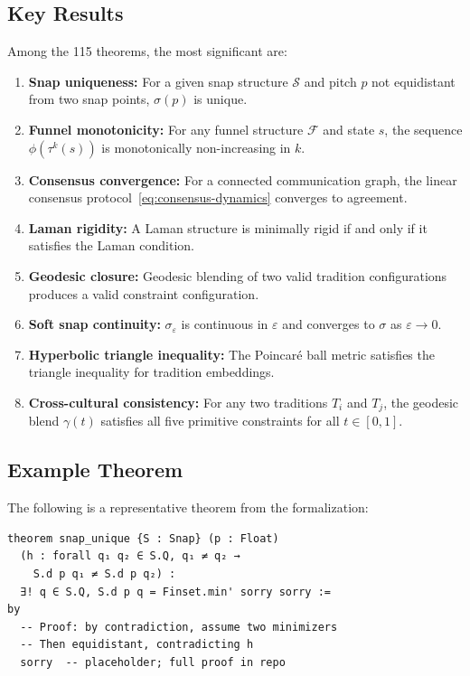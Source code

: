 \documentclass[cmj]{article}
\newcommand{\eps}{\varepsilon}
\begin{document}
\subsection{Key Results}

Among the 115 theorems, the most significant are:

\begin{enumerate}[nosep]
  \item \textbf{Snap uniqueness:} For a given snap structure $\mathcal{S}$ and
    pitch $p$ not equidistant from two snap points, $\sigma(p)$ is unique.
  \item \textbf{Funnel monotonicity:} For any funnel structure $\mathcal{F}$
    and state $s$, the sequence $\phi(\tau^k(s))$ is monotonically
    non-increasing in $k$.
  \item \textbf{Consensus convergence:} For a connected communication graph,
    the linear consensus protocol~\eqref{eq:consensus-dynamics} converges to
    agreement.
  \item \textbf{Laman rigidity:} A Laman structure is minimally rigid if and
    only if it satisfies the Laman condition.
  \item \textbf{Geodesic closure:} Geodesic blending of two valid tradition
    configurations produces a valid constraint configuration.
  \item \textbf{Soft snap continuity:} $\sigma_\eps$ is continuous in $\eps$
    and converges to $\sigma$ as $\eps \to 0$.
  \item \textbf{Hyperbolic triangle inequality:} The Poincar\'{e} ball metric
    satisfies the triangle inequality for tradition embeddings.
  \item \textbf{Cross-cultural consistency:} For any two traditions $T_i$ and
    $T_j$, the geodesic blend $\gamma(t)$ satisfies all five primitive
    constraints for all $t \in [0, 1]$.
\end{enumerate}

\subsection{Example Theorem}

The following is a representative theorem from the formalization:

\begin{lstlisting}[style=lean,caption={Example: snap uniqueness in Lean 4}]
theorem snap_unique {S : Snap} (p : Float)
  (h : forall q₁ q₂ ∈ S.Q, q₁ ≠ q₂ →
    S.d p q₁ ≠ S.d p q₂) :
  ∃! q ∈ S.Q, S.d p q = Finset.min' sorry sorry :=
by
  -- Proof: by contradiction, assume two minimizers
  -- Then equidistant, contradicting h
  sorry  -- placeholder; full proof in repo
\end{lstlisting}
\end{document}
